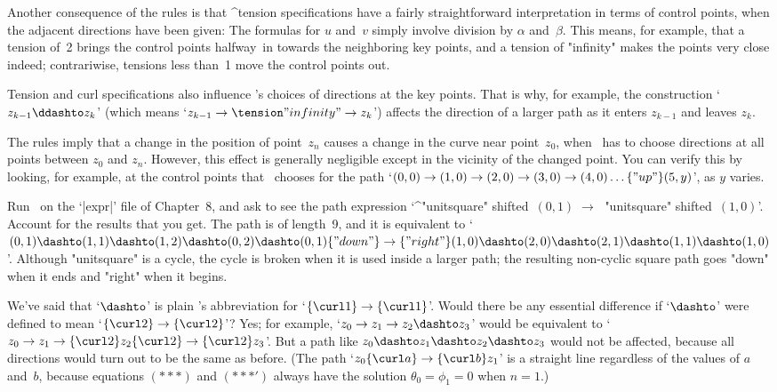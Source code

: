 {{{{\danger Another consequence of the rules is that ^{tension} specifications
have a fairly straightforward interpretation in terms of control points,
when the adjacent directions have been given: The formulas for $u$ and~$v$
simply involve division by $\alpha$ and~$\beta$. This means, for example,
that a tension of~2 brings the control points halfway~in towards the
neighboring key points, and a tension of "infinity" makes the points very
close indeed; contrariwise, tensions less than~1 move the control
points out.

\danger Tension and curl specifications also influence \MF's choices of
directions at the key points. That is why, for example, the construction
`$z_{k-1}\ddashto z_k$' (which means `$z_{k-1}\to\tension"infinity"\to
z_k$'\thinspace) affects the direction of a larger path as it enters
$z_{k-1}$ and leaves $z_k$.

\danger The rules imply that a change in the position of point~$z_n$
causes a change in the curve near point~$z_0$, when \MF\ has to choose
directions at all points between $z_0$ and $z_n$. However, this effect
is generally negligible except in the vicinity of the changed point.
You can verify this by looking, for example, at the control
points that \MF\ chooses for the path `$(0,0)\to(1,0)\to(2,0)\to
(3,0)\to(4,0)\ldots\{"up"\}(5,y)$', as $y$ varies.

\ddangerexercise Run \MF\ on the `|expr|' file of Chapter~8, and ask
to see the path expression `^"unitsquare" shifted~$(0,1)\;\to\;$
"unitsquare" shifted~$(1,0)$'. Account for the results that you get.
\answer The path is of length~9, and it is equivalent to
`$(0,1)\dashto(1,1)\dashto(1,2)\dashto(0,2)\dashto(0,1)\{"down"\}
\to\{"right"\}(1,0)\dashto(2,0)\dashto(2,1)\dashto(1,1)\dashto(1,0)$'.
Although "unitsquare" is a cycle, the cycle is broken when it is used
inside a larger path; the resulting non-cyclic square path goes "down"
when it ends and "right" when it begins.

\ddangerexercise We've said that `$\dashto$' is plain \MF's abbreviation
for `$\{\curl1\}\to\{\curl1\}$'. Would there be any essential difference
if `$\dashto$' were defined to mean `$\{\curl2\}\to\{\curl2\}$'\thinspace?
\answer Yes; for example, `$z_0\to z_1\to z_2\dashto z_3$' would be
equivalent to `$z_0\to z_1\to\{\curl2\}z_2\{\curl2\}\to\{\curl2\}z_3$'.
But a path like $z_0\dashto z_1\dashto z_2\dashto z_3$ would not be
affected, because all directions would turn out to be the same as before.
(The path `$z_0\{\curl a\}\to\{\curl b\}z_1$' is a straight line regardless
of the values of $a$ and~$b$, because equations $({\ast}{\ast}{\ast})$
and $({\ast}{\ast}{\ast}')$ always have the solution $\theta_0=\phi_1=0$
when $n=1$.)

}}}}
